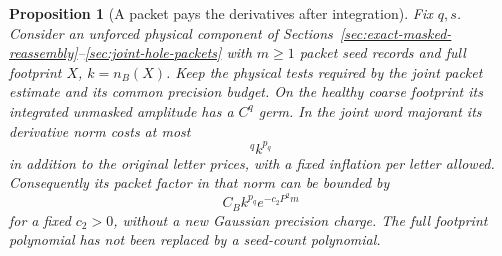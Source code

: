 \documentclass[11pt,reqno]{amsart}
\numberwithin{equation}{section}
\newtheorem{proposition}[theorem]{Proposition}
\theoremstyle{definition}
\theoremstyle{remark}
\begin{document}
\begin{proposition}[A packet pays the derivatives after integration]
\label{prop:output-packet-derivatives}
Fix \(q,s\). Consider an unforced physical component of
Sections~\ref{sec:exact-masked-reassembly}--\ref{sec:joint-hole-packets}
with \(m\ge1\) packet seed records and full footprint \(X\),
\(k=n_B(X)\). Keep the physical tests required by the joint
packet estimate and its common precision budget. On the
healthy coarse footprint its integrated unmasked amplitude
has a \(C^q\) germ. In the joint word majorant its derivative
norm costs at most
\begin{equation}
             [C_B(1+P^2+\beta h_c)]^q k^{p_q}
 \label{eq:output-raw-packet-jet-price}
\end{equation}
in addition to the original letter prices, with a fixed
inflation per letter allowed. Consequently its packet factor
in that norm can be bounded by
\begin{equation}
                         C_Bk^{p_q}e^{-c_2P^2m}
 \label{eq:output-paid-packet-jet-price}
\end{equation}
for a fixed \(c_2>0\), without a new Gaussian precision
charge. The full footprint polynomial has not been replaced
by a seed-count polynomial.
\end{proposition}
\end{document}
